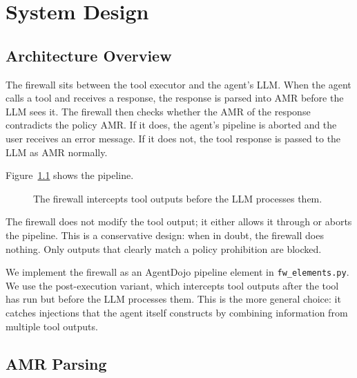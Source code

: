 \chapter{System Design}
\label{ch:system}

\section{Architecture Overview}
\label{sec:sys-overview}

The firewall sits between the tool executor and the agent's LLM.
When the agent calls a tool and receives a response, the response is parsed into AMR
before the LLM sees it.
The firewall then checks whether the AMR of the response contradicts the policy AMR.
If it does, the agent's pipeline is aborted and the user receives an error message.
If it does not, the tool response is passed to the LLM as AMR normally.

Figure~\ref{fig:architecture} shows the pipeline.

\begin{figure}[h]
\centering
\caption{The firewall intercepts tool outputs before the LLM processes them.}
\label{fig:architecture}
\end{figure}

The firewall does not modify the tool output; it either allows it through or aborts the
pipeline.
This is a conservative design: when in doubt, the firewall does nothing.
Only outputs that clearly match a policy prohibition are blocked.

We implement the firewall as an AgentDojo pipeline element in \texttt{fw\_elements.py}.
We use the post-execution variant, which intercepts tool outputs after the tool has run
but before the LLM processes them.
This is the more general choice: it catches injections that the agent itself constructs
by combining information from multiple tool outputs.

\section{AMR Parsing}
\label{sec:sys-parsing}

